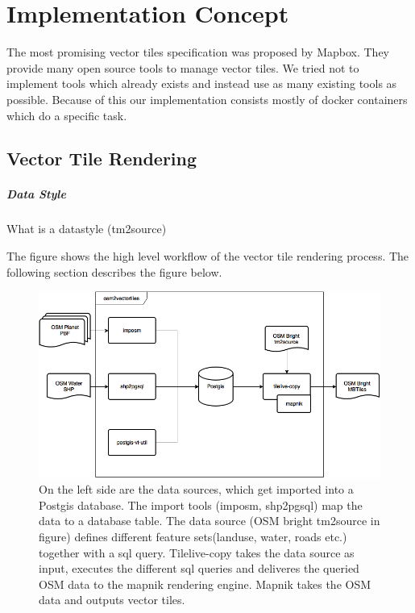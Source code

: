 \chapter{Implementation Concept}

The most promising vector tiles specification was proposed by Mapbox.
They provide many open source tools to manage vector tiles. We tried not to implement tools which already exists and instead use as many existing tools as possible. Because of this our implementation consists mostly of docker containers which do a specific task.

\section{Vector Tile Rendering}

\paragraph{Data Style} What is a datastyle (tm2source)

The figure shows the high level workflow of the vector tile rendering process. The following section describes the figure below.



\begin{figure}[h]
  \centering
  \includegraphics[width=1\textwidth]{images/osm2vectortiles.png}
  \caption{On the left side are the data sources, which get imported into a Postgis database. The import tools (imposm, shp2pgsql) map the data to a database table.
The data source (OSM bright tm2source in figure) defines different feature sets(landuse, water, roads etc.) together with a sql query.
Tilelive-copy takes the data source as input, executes the different sql queries and deliveres the queried OSM data to the mapnik rendering engine. Mapnik takes the OSM data and outputs vector tiles.
  }
\end{figure}

